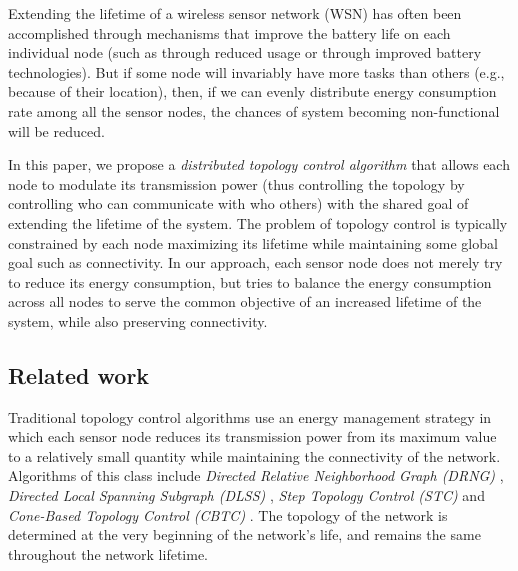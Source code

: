 \documentclass[journal,12pt,onecolumn]{IEEEtran}
\begin{document}
Extending the lifetime of a wireless sensor network (WSN) has often been
accomplished through mechanisms that improve the battery life on
each individual node (such as through reduced usage or
through improved battery technologies). But if some node will
invariably have more tasks than others (e.g., because of their
location), then, if we can evenly distribute energy consumption rate among all the sensor nodes,
the chances of system becoming non-functional will be reduced. 




In this paper, we
propose a {\em distributed topology control algorithm}
that allows each node to modulate its transmission power (thus
controlling the topology by controlling who can communicate with who
others) with the shared goal of extending the lifetime of the
system. The problem of topology control is typically constrained by
each node maximizing its lifetime while maintaining some global goal
such as connectivity. In our approach, each sensor node does not
merely try to reduce its energy consumption, but tries to balance the
energy consumption across all nodes to serve the common objective of
an increased lifetime of the system, while also preserving
connectivity.








\subsection{Related work}\label{sec:related_work}
Traditional topology control algorithms use an energy
management strategy in which each sensor node reduces its
transmission power from its maximum value to a relatively small
quantity while maintaining the connectivity of the network.
Algorithms of this class include {\em Directed
Relative Neighborhood Graph (DRNG)} \cite{LiHou2005-1313}, {\em Directed Local Spanning Subgraph (DLSS)} \cite{LiHou2005-1313}, \emph{ Step Topology
Control (STC)} \cite{SetGer2010} and \emph{ Cone-Based Topology Control (CBTC)}
\cite{LiHal2005}. The topology of the network is
determined at the very beginning of the network's life, and
remains the same throughout the network lifetime.
\end{document}
